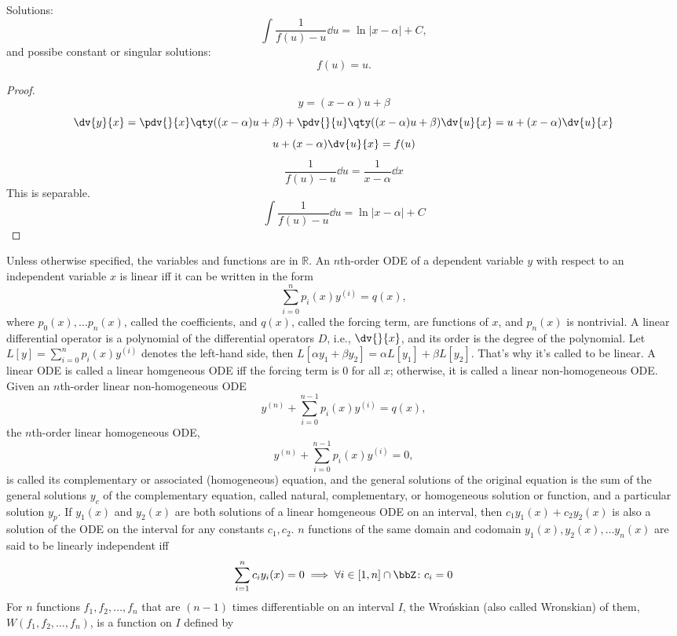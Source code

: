\documentclass[a4paper,12pt]{report}
\begin{document}
Solutions:
\[\int\frac{1}{f(u)-u}\dd{u}=\ln|x-\alpha|+C,\]
and possibe constant or singular solutions:
\[f(u)=u.\]
\begin{proof}
\[y=(x-\alpha)u+\beta\]
\[\dv{y}{x}=\pdv{}{x}\qty((x-\alpha)u+\beta)+\pdv{}{u}\qty((x-\alpha)u+\beta)\dv{u}{x}=u+(x-\alpha)\dv{u}{x}\]
\[u+(x-\alpha)\dv{u}{x}=f(u)\]
\[\frac{1}{f(u)-u}\dd{u}=\frac{1}{x-\alpha}\dd{x}\]
This is separable.
\[\int\frac{1}{f(u)-u}\dd{u}=\ln|x-\alpha|+C\]
\end{proof}
Unless otherwise specified, the variables and functions are in $\mathbb{R}$.
An $n$th-order ODE of a dependent variable $y$ with respect to an independent variable $x$ is linear iff it can be written in the form
\[\sum_{i=0}^np_i(x)y^{(i)}=q(x),\]
where $p_0(x),\dots p_n(x)$, called the coefficients, and $q(x)$, called the forcing term, are functions of $x$, and $p_n(x)$ is nontrivial.
A linear differential operator is a polynomial of the differential operators $D$, i.e., $\dv{}{x}$, and its order is the degree of the polynomial.
Let $L[y]=\sum_{i=0}^np_i(x)y^{(i)}$ denotes the left-hand side, then $L[\alpha y_1+\beta y_2]=\alpha L[y_1]+\beta L[y_2]$. That's why it's called to be linear.
A linear ODE is called a linear homgeneous ODE iff the forcing term is 0 for all $x$; otherwise, it is called a linear non-homogeneous ODE.
Given an $n$th-order linear non-homogeneous ODE
\[y^{(n)}+\sum_{i=0}^{n-1}p_i(x)y^{(i)}=q(x),\]
the $n$th-order linear homogeneous ODE,
\[y^{(n)}+\sum_{i=0}^{n-1}p_i(x)y^{(i)}=0,\]
is called its complementary or associated (homogeneous) equation, and the general solutions of the original equation is the sum of the general solutions $y_c$ of the complementary equation, called natural, complementary, or homogeneous solution or function, and a particular solution $y_p$.
If $y_1(x)$ and $y_2(x)$ are both solutions of a linear homgeneous ODE on an interval, then $c_1y_1(x)+c_2y_2(x)$ is also a solution of the ODE on the interval for any constants $c_1,c_2$.
$n$ functions of the same domain and codomain $y_1(x),y_2(x),\ldots y_n(x)$ are said to be linearly independent iff
\[\sum_{i=1}^nc_iy_i(x)=0\implies\forall i\in[1,n]\cap\bbZ\colon c_i=0\]
For $n$ functions $f_1,f_2,\ldots,f_n$ that are $(n-1)$ times differentiable on an interval $I$, the Wrońskian (also called Wronskian) of them, $W(f_1,f_2,\ldots,f_n)$, is a function on $I$ defined by
\end{document}
